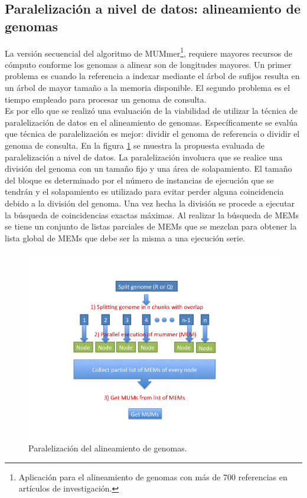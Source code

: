 \documentclass[12pt,a4paper]{article}
\begin{document}
\subsection{Paralelización a nivel de datos: alineamiento de genomas}
\indent
La versión secuencial del algoritmo de MUMmer\footnote{Aplicación para el alineamiento de genomas con más de 700 referencias en artículos de investigación.}, requiere mayores recursos de cómputo conforme los genomas a alinear son de longitudes mayores. Un primer problema es cuando la referencia a indexar mediante el árbol de sufijos resulta en un árbol de mayor tamaño a la memoria disponible. El segundo problema es el tiempo empleado para procesar un genoma de consulta.\\
\indent
Es por ello que se realizó una evaluación de la viabilidad de utilizar la t\'ecnica de paralelización de datos en el alineamiento de genomas. Específicamente se evalúa que t\'ecnica de paralelización es mejor: dividir el genoma de referencia o dividir el genoma de consulta. En la figura \ref{fig:algo} se muestra la propuesta evaluada de paralelización a nivel de datos. La paralelización involucra que se realice una división del genoma con un tamaño fijo y una área de solapamiento. El tamaño del bloque es determinado por el número de instancias de ejecución que se tendrán y el solapamiento es utilizado para evitar perder alguna coincidencia debido a la división del genoma. Una vez hecha la división se procede a ejecutar la búsqueda de coincidencias exactas máximas. Al realizar la búsqueda de MEMs se tiene un conjunto de listas parciales de MEMs que se mezclan para obtener la lista global de MEMs que debe ser la misma a una ejecución serie.\\
   \begin{figure}[h] 
   \centering 
   \includegraphics[scale=0.4]{algorithm.png} 
   \caption{Paralelización del alineamiento de genomas.} 
   \label{fig:algo} 
 \end{figure}
\end{document}
